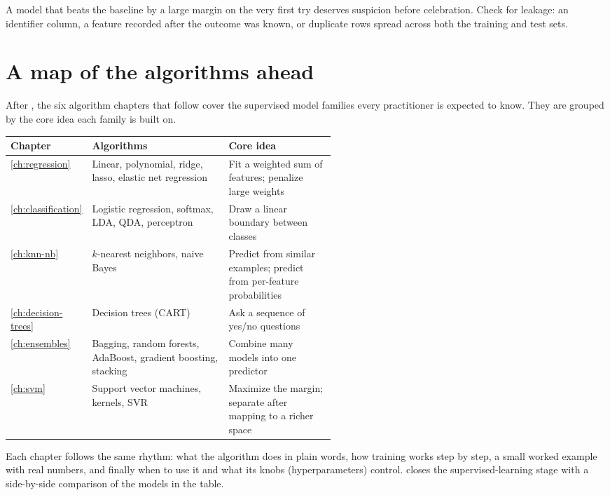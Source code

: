 \begin{pitfall}
A model that beats the baseline by a large margin on the very first try deserves suspicion before celebration. Check for leakage: an identifier column, a feature recorded after the outcome was known, or duplicate rows spread across both the training and test sets.
\end{pitfall}

\section{A map of the algorithms ahead}

After , the six algorithm chapters that follow cover the supervised model families every practitioner is expected to know. They are grouped by the core idea each family is built on.

\begin{mltable}
\renewcommand{\arraystretch}{1.16}
\setlength{\tabcolsep}{5pt}
\begin{tabularx}{\linewidth}{@{}>{\footnotesize\raggedright\arraybackslash}p{0.12\linewidth}>{\footnotesize\raggedright\arraybackslash}p{0.42\linewidth}>{\footnotesize\raggedright\arraybackslash}X@{}}
\toprule
\rowcolor{MLPaleBlue!92}
\normalfont\bfseries Chapter & \bfseries Algorithms & \bfseries Core idea \\
\midrule
\ref{ch:regression} & Linear, polynomial, ridge, lasso, elastic net regression & Fit a weighted sum of features; penalize large weights \\
\ref{ch:classification} & Logistic regression, softmax, LDA, QDA, perceptron & Draw a linear boundary between classes \\
\ref{ch:knn-nb} & $k$-nearest neighbors, naive Bayes & Predict from similar examples; predict from per-feature probabilities \\
\ref{ch:decision-trees} & Decision trees (CART) & Ask a sequence of yes/no questions \\
\ref{ch:ensembles} & Bagging, random forests, AdaBoost, gradient boosting, stacking & Combine many models into one predictor \\
\ref{ch:svm} & Support vector machines, kernels, SVR & Maximize the margin; separate after mapping to a richer space \\
\bottomrule
\end{tabularx}
\end{mltable}

Each chapter follows the same rhythm: what the algorithm does in plain words, how training works step by step, a small worked example with real numbers, and finally when to use it and what its knobs (hyperparameters) control.  closes the supervised-learning stage with a side-by-side comparison of the models in the table.

